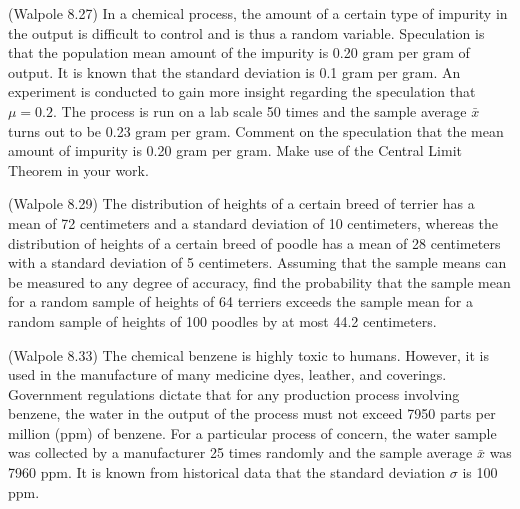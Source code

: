 \documentclass[14pt]{exam}
\begin{document}
\begin{questions}
		
		\question
		(Walpole 8.27)
		In a chemical process, the amount of a certain type of impurity in the output is difficult to control and is thus a random variable. Speculation is that the population mean amount of the impurity is 0.20 gram per gram of output. It is known that the standard deviation is 0.1 gram per gram. An experiment is conducted to gain more insight regarding the speculation that $\mu = 0.2$. The process is run on a lab scale 50 times and the sample average $\bar{x}$ turns out to be 0.23 gram per gram. Comment on the speculation that the mean amount of impurity is 0.20 gram per gram. Make use of the Central Limit Theorem in your work.

		\question
		(Walpole 8.29)
		The distribution of heights of a certain breed of terrier has a mean of 72 centimeters and a standard deviation of 10 centimeters, whereas the distribution of heights of a certain breed of poodle has a mean of 28 centimeters with a standard deviation of 5 centimeters. Assuming that the sample means can be measured to any degree of accuracy, find the probability that the sample mean for a random sample of heights of 64 terriers exceeds the sample mean for a random sample of heights of 100 poodles by at most 44.2 centimeters.
		
		\question
		(Walpole 8.33)
		The chemical benzene is highly toxic to humans. However, it is used in the manufacture of many medicine dyes, leather, and coverings. Government regulations dictate that for any production process involving benzene, the water in the output of the process must not exceed 7950 parts per million (ppm) of benzene. For a particular process of concern, the water sample was collected by a manufacturer 25 times randomly and the sample average $\bar{x}$ was 7960 ppm. It is known from historical data that the standard deviation $\sigma$ is 100 ppm.
		
\end{questions}
\end{document}
